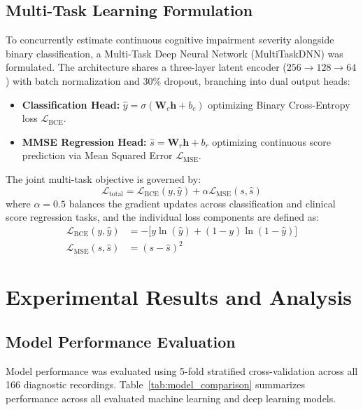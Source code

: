 \documentclass[conference]{IEEEtran}
\begin{document}
\subsection{Multi-Task Learning Formulation}
To concurrently estimate continuous cognitive impairment severity alongside binary classification, a Multi-Task Deep Neural Network (MultiTaskDNN) was formulated. The architecture shares a three-layer latent encoder ($256 \to 128 \to 64$) with batch normalization and 30\% dropout, branching into dual output heads:
\begin{itemize}
    \item \textbf{Classification Head:} $\hat{y} = \sigma(\mathbf{W}_c \mathbf{h} + b_c)$ optimizing Binary Cross-Entropy loss $\mathcal{L}_{\text{BCE}}$.
    \item \textbf{MMSE Regression Head:} $\hat{s} = \mathbf{W}_r \mathbf{h} + b_r$ optimizing continuous score prediction via Mean Squared Error $\mathcal{L}_{\text{MSE}}$.
\end{itemize}
The joint multi-task objective is governed by:
\begin{equation}
\mathcal{L}_{\text{total}} = \mathcal{L}_{\text{BCE}}(y, \hat{y}) + \alpha \mathcal{L}_{\text{MSE}}(s, \hat{s})
\label{eq:mtl_loss}
\end{equation}
where $\alpha = 0.5$ balances the gradient updates across classification and clinical score regression tasks, and the individual loss components are defined as:
\begin{align}
\mathcal{L}_{\text{BCE}}(y, \hat{y}) &= - \big[ y \ln(\hat{y}) + (1 - y) \ln(1 - \hat{y}) \big] \\
\mathcal{L}_{\text{MSE}}(s, \hat{s}) &= (s - \hat{s})^2
\end{align}

\section{Experimental Results and Analysis}

\subsection{Model Performance Evaluation}
Model performance was evaluated using 5-fold stratified cross-validation across all 166 diagnostic recordings. Table~\ref{tab:model_comparison} summarizes performance across all evaluated machine learning and deep learning models.
\end{document}
